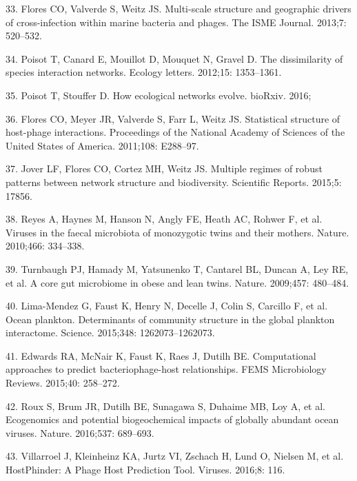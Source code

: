 \documentclass[12pt,]{article}
\begin{document}
\hypertarget{ref-Flores:2013hc}{}
33. Flores CO, Valverde S, Weitz JS. Multi-scale structure and
geographic drivers of cross-infection within marine bacteria and phages.
The ISME Journal. 2013;7: 520--532.

\hypertarget{ref-Poisot:2012fh}{}
34. Poisot T, Canard E, Mouillot D, Mouquet N, Gravel D. The
dissimilarity of species interaction networks. Ecology letters. 2012;15:
1353--1361.

\hypertarget{ref-Poisot071993}{}
35. Poisot T, Stouffer D. How ecological networks evolve. bioRxiv. 2016;

\hypertarget{ref-Flores:2011bh}{}
36. Flores CO, Meyer JR, Valverde S, Farr L, Weitz JS. Statistical
structure of host-phage interactions. Proceedings of the National
Academy of Sciences of the United States of America. 2011;108: E288--97.

\hypertarget{ref-Jover:2015ev}{}
37. Jover LF, Flores CO, Cortez MH, Weitz JS. Multiple regimes of robust
patterns between network structure and biodiversity. Scientific Reports.
2015;5: 17856.

\hypertarget{ref-Reyes:2010cwa}{}
38. Reyes A, Haynes M, Hanson N, Angly FE, Heath AC, Rohwer F, et al.
Viruses in the faecal microbiota of monozygotic twins and their mothers.
Nature. 2010;466: 334--338.

\hypertarget{ref-Turnbaugh:2009ei}{}
39. Turnbaugh PJ, Hamady M, Yatsunenko T, Cantarel BL, Duncan A, Ley RE,
et al. A core gut microbiome in obese and lean twins. Nature. 2009;457:
480--484.

\hypertarget{ref-LimaMendez:2015hw}{}
40. Lima-Mendez G, Faust K, Henry N, Decelle J, Colin S, Carcillo F, et
al. Ocean plankton. Determinants of community structure in the global
plankton interactome. Science. 2015;348: 1262073--1262073.

\hypertarget{ref-Edwards:2015iz}{}
41. Edwards RA, McNair K, Faust K, Raes J, Dutilh BE. Computational
approaches to predict bacteriophage-host relationships. FEMS
Microbiology Reviews. 2015;40: 258--272.

\hypertarget{ref-Roux:2016cc}{}
42. Roux S, Brum JR, Dutilh BE, Sunagawa S, Duhaime MB, Loy A, et al.
Ecogenomics and potential biogeochemical impacts of globally abundant
ocean viruses. Nature. 2016;537: 689--693.

\hypertarget{ref-Villarroel:2016jy}{}
43. Villarroel J, Kleinheinz KA, Jurtz VI, Zschach H, Lund O, Nielsen M,
et al. HostPhinder: A Phage Host Prediction Tool. Viruses. 2016;8: 116.
\end{document}
